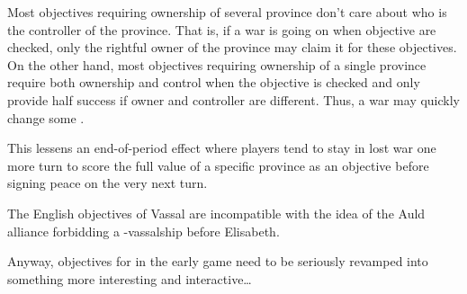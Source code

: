 \bparag Most objectives requiring ownership of several province don't
care about who is the controller of the province. That is, if a war is
going on when objective are checked, only the rightful owner of the
province may claim it for these objectives.
\bparag On the other hand, most objectives requiring ownership of a
single province require both ownership and control when the objective is
checked and only provide half success if owner and controller are
different. Thus, a war may quickly change some \VPs.

\begin{designnote}
  This lessens an end-of-period effect where players tend to stay in
  lost war one more turn to score the full \VPs value of a specific
  province as an objective before signing peace on the very next turn.
\end{designnote}

\begin{todo}
  The English objectives of \paysEcosse Vassal are incompatible with the
  idea of the Auld alliance forbidding a \ANG-\paysEcosse vassalship
  before Elisabeth.

  Anyway, objectives for \ANG in the early game need to be seriously
  revamped into something more interesting and interactive\ldots
\end{todo}



\def\EUobjectives#1{%
  \EUcurrentcountry{#1} \csname subsection\endcsname {Objectives of
    \paysmajeur{#1}} \EUobjectivesa{I} \EUobjectivesa{II} \EUobjectivesa{III}
  \EUobjectivesa{IV} \EUobjectivesa{V} \EUobjectivesa{VI} \EUobjectivesa{VII}
} \def\EUobjectivesa#1{ \EUcurrentperiod{#1}
  \EUcasevalue{objective@\EUcurrcoun @\EUcurrper @1@short}{}{ \csname
    subsubsection\endcsname {Period \period{#1}} \EUobjectivesb{1}
    \EUobjectivesb{2} \EUobjectivesb{3} \EUobjectivesb{4} \EUobjectivesb{5} }}
\def\EUobjectivesb#1{ \EUcasevalue{objective@\EUcurrcoun @\EUcurrper
    @#1@short}{}{ \def\RES##1{##1}%
    \def\EUAbbr##1{##1}
    \aparag
    \EUvalue{objective@\EUcurrcoun @\EUcurrper @#1@short}{}%
    \EUcasevalue{objective@\EUcurrcoun @\EUcurrper @#1@letters}{%
    }{%
      (\EUvalue{objective@\EUcurrcoun @\EUcurrper @#1@letters}{})%
    }: %
    \EUcasevalue{objective@\EUcurrcoun @\EUcurrper @#1@per}{%
      \EUvalue{objective@\EUcurrcoun @\EUcurrper @#1@max}{}~\VPs%
      \EUcasevalue{objective@\EUcurrcoun @\EUcurrper @#1@score}{%
      }{%
        ~(\undemi: \EUvalue{objective@\EUcurrcoun @\EUcurrper
          @#1@score}{}~\VPs)%
      }%
    }{%
      \EUvalue{objective@\EUcurrcoun @\EUcurrper @#1@score}{} per
      \EUvalue{objective@\EUcurrcoun @\EUcurrper @#1@per}{} ~(max
      \EUvalue{objective@\EUcurrcoun @\EUcurrper @#1@max}{})%
    }%
    \EUcasevalue{objective@\EUcurrcoun @\EUcurrper @#1@desc}{%
    }{%
      ~--- \EUvalue{objective@\EUcurrcoun @\EUcurrper @#1@desc}{}.%
    }%
  } }

